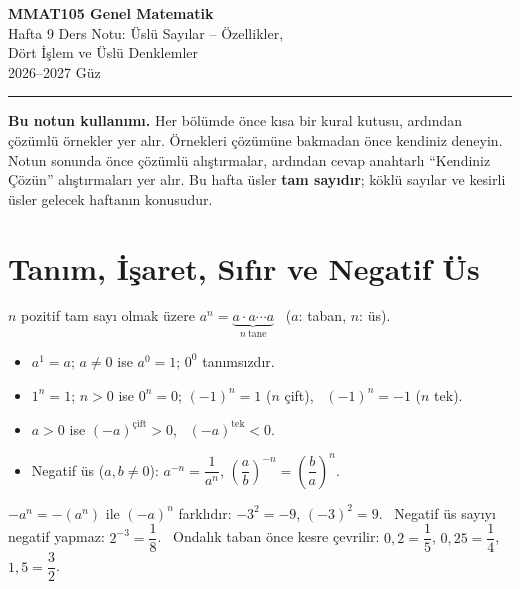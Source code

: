 \documentclass[11pt,a4paper]{article}
\begin{document}
\begin{minipage}[c]{\textwidth}
{\LARGE\bfseries\color{anamavi} MMAT105 Genel Matematik}\\[4pt]
{\large Hafta 9 Ders Notu: Üslü Sayılar -- Özellikler,\\ Dört İşlem ve Üslü Denklemler}\\[6pt]
{\small 2026--2027 Güz}
\end{minipage}

\vspace{4pt}\noindent\textcolor{anamavi}{\rule{\textwidth}{1pt}}

\textbf{Bu notun kullanımı.} Her bölümde önce kısa bir kural kutusu, ardından çözümlü örnekler yer alır. Örnekleri çözümüne bakmadan önce kendiniz deneyin. Notun sonunda önce çözümlü alıştırmalar, ardından cevap anahtarlı ``Kendiniz Çözün'' alıştırmaları yer alır. Bu hafta üsler \textbf{tam sayıdır}; köklü sayılar ve kesirli üsler gelecek haftanın konusudur.

\section{Tanım, İşaret, Sıfır ve Negatif Üs}

\begin{kural}[Tanım]
\(n\) pozitif tam sayı olmak üzere \(a^n=\underbrace{a\cdot a\cdots a}_{n\ \text{tane}}\) \ (\(a\): taban, \(n\): üs).
\begin{itemize}[leftmargin=*,itemsep=1pt]
\item \(a^1=a\); \quad \(a\neq 0\) ise \(a^0=1\); \quad \(0^0\) tanımsızdır.
\item \(1^n=1\); \quad \(n>0\) ise \(0^n=0\); \quad \((-1)^n=1\) (\(n\) çift), \ \((-1)^n=-1\) (\(n\) tek).
\item \(a>0\) ise \((-a)^{\text{çift}}>0\), \ \((-a)^{\text{tek}}<0\).
\item Negatif üs (\(a,b\neq 0\)): \quad \(a^{-n}=\dfrac{1}{a^n}\), \qquad \(\left(\dfrac{a}{b}\right)^{-n}=\left(\dfrac{b}{a}\right)^{n}\).
\end{itemize}
\end{kural}

\begin{dikkat}
\(-a^n=-(a^n)\) ile \((-a)^n\) farklıdır: \(-3^2=-9\), \((-3)^2=9\). \ Negatif üs sayıyı negatif yapmaz: \(2^{-3}=\dfrac18\). \ Ondalık taban önce kesre çevrilir: \(0{,}2=\dfrac15\), \(0{,}25=\dfrac14\), \(1{,}5=\dfrac32\).
\end{dikkat}
\end{document}
